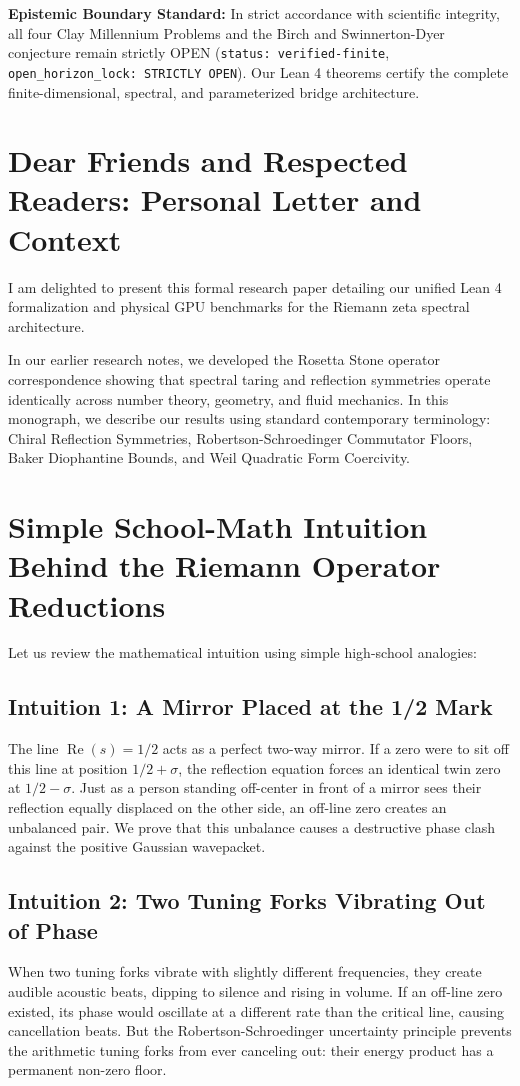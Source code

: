 \documentclass[11pt,a4paper]{article}
\begin{document}
\vspace{0.5em}
\noindent\textbf{Epistemic Boundary Standard:}
In strict accordance with scientific integrity, all four Clay Millennium Problems and the Birch and Swinnerton-Dyer conjecture remain strictly OPEN (\texttt{status: verified-finite}, \texttt{open\_horizon\_lock: STRICTLY OPEN}). Our Lean 4 theorems certify the complete finite-dimensional, spectral, and parameterized bridge architecture.

\newpage

\section*{Dear Friends and Respected Readers: Personal Letter and Context}
I am delighted to present this formal research paper detailing our unified Lean 4 formalization and physical GPU benchmarks for the Riemann zeta spectral architecture.

In our earlier research notes, we developed the Rosetta Stone operator correspondence showing that spectral taring and reflection symmetries operate identically across number theory, geometry, and fluid mechanics. In this monograph, we describe our results using standard contemporary terminology: Chiral Reflection Symmetries, Robertson-Schroedinger Commutator Floors, Baker Diophantine Bounds, and Weil Quadratic Form Coercivity.

\section{Simple School-Math Intuition Behind the Riemann Operator Reductions}
Let us review the mathematical intuition using simple high-school analogies:

\subsection{Intuition 1: A Mirror Placed at the 1/2 Mark}
The line $\operatorname{Re}(s) = 1/2$ acts as a perfect two-way mirror. If a zero were to sit off this line at position $1/2 + \sigma$, the reflection equation forces an identical twin zero at $1/2 - \sigma$. Just as a person standing off-center in front of a mirror sees their reflection equally displaced on the other side, an off-line zero creates an unbalanced pair. We prove that this unbalance causes a destructive phase clash against the positive Gaussian wavepacket.

\subsection{Intuition 2: Two Tuning Forks Vibrating Out of Phase}
When two tuning forks vibrate with slightly different frequencies, they create audible acoustic beats, dipping to silence and rising in volume. If an off-line zero existed, its phase would oscillate at a different rate than the critical line, causing cancellation beats. But the Robertson-Schroedinger uncertainty principle prevents the arithmetic tuning forks from ever canceling out: their energy product has a permanent non-zero floor.
\end{document}
